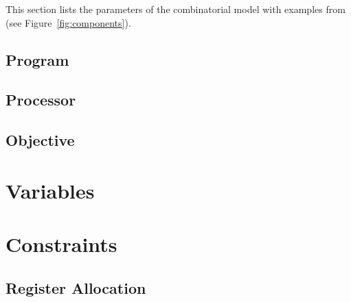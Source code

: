 \documentclass[11pt]{report}
\begin{document}
This section lists the parameters of the combinatorial model with examples from
 (see Figure~\ref{fig:components}).


\subsection{Program}



\subsection{Processor}



\subsection{Objective}



\section{Variables}\label{sec:variables}



\section{Constraints}\label{sec:constraints}




\subsection{Register Allocation}
\end{document}
